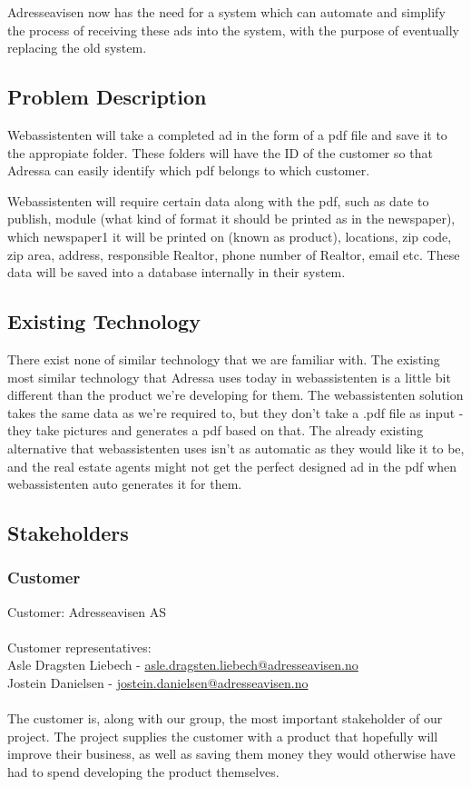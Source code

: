 Adresseavisen now has the need for a system which can automate and simplify the process of receiving these ads into the system, with the purpose of eventually replacing the old system.

\subsection{Problem Description}
Webassistenten will take a completed ad in the form of a pdf file and save it to the appropiate folder. These folders will have the ID of the customer so that Adressa can easily identify which pdf belongs to which customer.

Webassistenten will require certain data along with the pdf, such as date to publish, module (what kind of format it should be printed as in the newspaper), which newspaper1 it will be printed on (known as product), locations, zip code, zip area, address, responsible Realtor, phone number of Realtor, email etc.  These data will be saved into a database internally in their system. 

\subsection{Existing Technology}
There exist none of similar technology that we are familiar with. The existing most similar technology that Adressa uses today in webassistenten is a little bit different than the product we're developing for them. The webassistenten solution takes the same data as we're required to, but they don't take a .pdf file as input - they take pictures and generates a pdf based on that. The already existing alternative that webassistenten uses isn't as automatic as they would like it to be, and the real estate agents might not get the perfect designed ad in the pdf when webassistenten auto generates it for them.

\subsection{Stakeholders}
\subsubsection{Customer}
Customer: Adresseavisen AS\\
\\
Customer representatives:\\
Asle Dragsten Liebech - \href{mailto://asle.dragsten.liebech@adresseavisen.no}{asle.dragsten.liebech@adresseavisen.no}\\
Jostein Danielsen - \href{mailto://josetein.danielsen@adresseavisen.no}{jostein.danielsen@adresseavisen.no}\\
\\
The customer is, along with our group, the most important stakeholder of our project. The project supplies the customer with a product that hopefully will improve their business, as well as saving them money they would otherwise have had to spend developing the product themselves.

